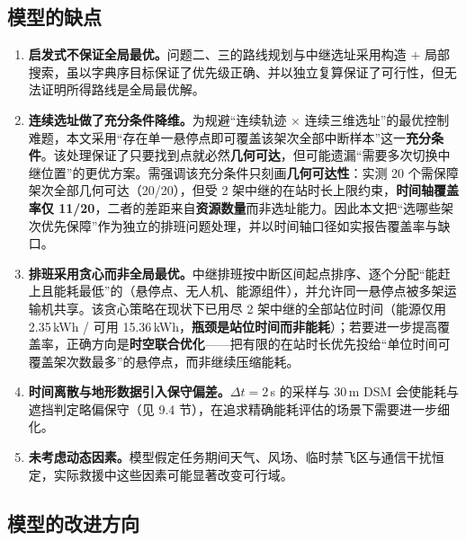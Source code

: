\subsection{模型的缺点}

\begin{enumerate}[label=\textbf{缺点 \arabic*}]
	\item \textbf{启发式不保证全局最优。}问题二、三的路线规划与中继选址采用构造 $+$ 局部搜索，虽以字典序目标保证了优先级正确、并以独立复算保证了可行性，但无法证明所得路线是全局最优解。
	\item \textbf{连续选址做了充分条件降维。}为规避“连续轨迹 $\times$ 连续三维选址”的最优控制难题，本文采用“存在单一悬停点即可覆盖该架次全部中断样本”这一\textbf{充分条件}。该处理保证了只要找到点就必然\textbf{几何可达}，但可能遗漏“需要多次切换中继位置”的更优方案。需强调该充分条件只刻画\textbf{几何可达性}：实测 20 个需保障架次全部几何可达（20/20），但受 2 架中继的在站时长上限约束，\textbf{时间轴覆盖率仅 11/20}，二者的差距来自\textbf{资源数量}而非选址能力。因此本文把“选哪些架次优先保障”作为独立的排班问题处理，并以时间轴口径如实报告覆盖率与缺口。
	\item \textbf{排班采用贪心而非全局最优。}中继排班按中断区间起点排序、逐个分配“能赶上且能耗最低”的（悬停点、无人机、能源组件），并允许同一悬停点被多架运输机共享。该贪心策略在现状下已用尽 2 架中继的全部站位时间（能源仅用 2.35\,kWh / 可用 15.36\,kWh，\textbf{瓶颈是站位时间而非能耗}）；若要进一步提高覆盖率，正确方向是\textbf{时空联合优化}——把有限的在站时长优先投给“单位时间可覆盖架次数最多”的悬停点，而非继续压缩能耗。
	\item \textbf{时间离散与地形数据引入保守偏差。}$\Delta t=2$\,s 的采样与 30\,m DSM 会使能耗与遮挡判定略偏保守（见 9.4 节），在追求精确能耗评估的场景下需要进一步细化。
	\item \textbf{未考虑动态因素。}模型假定任务期间天气、风场、临时禁飞区与通信干扰恒定，实际救援中这些因素可能显著改变可行域。
\end{enumerate}

\subsection{模型的改进方向}

